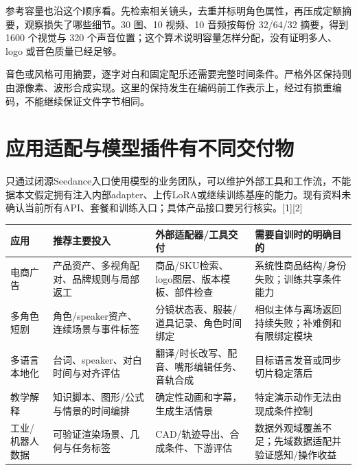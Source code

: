 参考容量也沿这个顺序看。先检索相关镜头，去重并标明角色属性，再压成定额摘要，观察损失了哪些细节。30 图、10 视频、10 音频按每份 32/64/32 摘要，得到 1600 个视觉与 320 个声音位置；这个算术说明容量怎样分配，没有证明多人、logo 或音色质量已经足够。

音色或风格可用摘要，逐字对白和固定配乐还需要完整时间条件。严格外区保持则由源像素、波形合成实现。这里的保持发生在编码前工作表示上，经过有损重编码，不能继续保证文件字节相同。

\section{应用适配与模型插件有不同交付物}\label{seedance-m27-ux5e94ux7528ux9002ux914dux4e0eux6a21ux578bux63d2ux4ef6ux6709ux4e0dux540cux4ea4ux4ed8ux7269}

只通过闭源Seedance入口使用模型的业务团队，可以维护外部工具和工作流，不能据本文假定拥有注入内部adapter、上传LoRA或继续训练基座的能力。现有资料未确认当前所有API、套餐和训练入口；具体产品接口要另行核实。{[}1{]}{[}2{]}

{\def\LTcaptype{table} %
\small\setlength{\tabcolsep}{3pt}\renewcommand{\arraystretch}{1.18}
\begin{longtable}[]{@{}
  >{\raggedright\arraybackslash}p{}
  >{\raggedright\arraybackslash}p{}
  >{\raggedright\arraybackslash}p{}
  >{\raggedright\arraybackslash}p{}@{}}
\toprule\noalign{}
\begin{minipage}[b]{\linewidth}\raggedright
应用
\end{minipage} & \begin{minipage}[b]{\linewidth}\raggedright
推荐主要投入
\end{minipage} & \begin{minipage}[b]{\linewidth}\raggedright
外部适配器/工具交付
\end{minipage} & \begin{minipage}[b]{\linewidth}\raggedright
需要自训时的明确目的
\end{minipage} \\
\midrule\noalign{}
\endhead
\bottomrule\noalign{}
\endlastfoot
电商广告 & 产品资产、多视角配对、品牌规则与局部返工 & 商品/SKU检索、logo图层、版本模板、部件检查 & 系统性商品结构/身份失败；训练共享条件能力 \\
多角色短剧 & 角色/speaker资产、连续场景与事件标签 & 分镜状态表、服装/道具记录、角色时间绑定 & 相似主体与离场返回持续失败；补难例和有限绑定模块 \\
多语言本地化 & 台词、speaker、对白时间与对齐评估 & 翻译/时长改写、配音、嘴形编辑任务、音轨合成 & 目标语言发音或同步切片稳定落后 \\
教学解释 & 知识脚本、图形/公式与情景的时间编排 & 确定性动画和字幕，生成生活情景 & 特定演示动作无法由现成条件控制 \\
工业/机器人数据 & 可验证渲染场景、几何与任务标签 & CAD/轨迹导出、合成条件、下游评估 & 数据外观域覆盖不足；先域数据适配并验证感知/操作收益 \\
\end{longtable}
}

